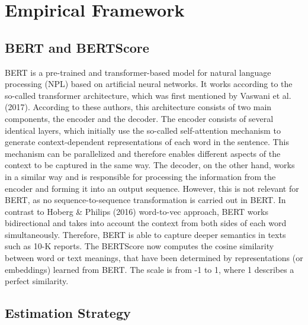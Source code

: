 \documentclass[
]{article}
\begin{document}
\section{Empirical Framework}\label{empirical-framework}

\subsection{BERT and BERTScore}\label{bert-and-bertscore}

BERT is a pre-trained and transformer-based model for natural language
processing (NPL) based on artificial neural networks. It works according
to the so-called transformer architecture, which was first mentioned by
Vaswani et al. (2017). According to these authors, this architecture
consists of two main components, the encoder and the decoder. The
encoder consists of several identical layers, which initially use the
so-called self-attention mechanism to generate context-dependent
representations of each word in the sentence. This mechanism can be
parallelized and therefore enables different aspects of the context to
be captured in the same way. The decoder, on the other hand, works in a
similar way and is responsible for processing the information from the
encoder and forming it into an output sequence. However, this is not
relevant for BERT, as no sequence-to-sequence transformation is carried
out in BERT. In contrast to Hoberg \& Philips (2016) word-to-vec
approach, BERT works bidirectional and takes into account the context
from both sides of each word simultaneously. Therefore, BERT is able to
capture deeper semantics in texts such as 10-K reports. The BERTScore
now computes the cosine similarity between word or text meanings, that
have been determined by representations (or embeddings) learned from
BERT. The scale is from -1 to 1, where 1 describes a perfect similarity.

\subsection{Estimation Strategy}\label{estimation-strategy}
\end{document}
